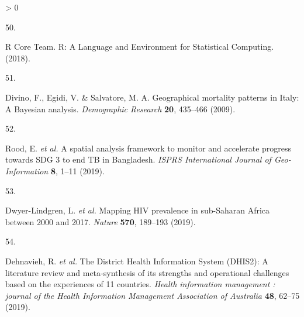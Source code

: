 \documentclass[
]{article}
\newlength{\cslhangindent}
\newlength{\csllabelwidth}
\newenvironment{CSLReferences}[2] %
 {%
  \setlength{\parindent}{0pt}
  \ifodd #1 \everypar{\setlength{\hangindent}{\cslhangindent}}\ignorespaces\fi
  \ifnum #2 > 0
  \setlength{\parskip}{#2\baselineskip}
  \fi
 }%
 {}
\newcommand{\CSLLeftMargin}[1]{\parbox[t]{\csllabelwidth}{#1}}
\newcommand{\CSLRightInline}[1]{\parbox[t]{\linewidth - \csllabelwidth}{#1}\break}
\begin{document}
\begin{CSLReferences}{0}{0}
\leavevmode\hypertarget{ref-RCoreTeam2018}{}%
\CSLLeftMargin{50. }
\CSLRightInline{R Core Team. {R: A Language and Environment for Statistical Computing}. (2018).}

\leavevmode\hypertarget{ref-Divino2009}{}%
\CSLLeftMargin{51. }
\CSLRightInline{Divino, F., Egidi, V. \& Salvatore, M. A. {Geographical mortality patterns in Italy: A Bayesian analysis}. \emph{Demographic Research} \textbf{20}, 435--466 (2009).}

\leavevmode\hypertarget{ref-Rood2019}{}%
\CSLLeftMargin{52. }
\CSLRightInline{Rood, E. \emph{et al.} {A spatial analysis framework to monitor and accelerate progress towards SDG 3 to end TB in Bangladesh}. \emph{ISPRS International Journal of Geo-Information} \textbf{8}, 1--11 (2019).}

\leavevmode\hypertarget{ref-Dwyer-Lindgren2019}{}%
\CSLLeftMargin{53. }
\CSLRightInline{Dwyer-Lindgren, L. \emph{et al.} {Mapping HIV prevalence in sub-Saharan Africa between 2000 and 2017}. \emph{Nature} \textbf{570}, 189--193 (2019).}

\leavevmode\hypertarget{ref-Dehnavieh2019}{}%
\CSLLeftMargin{54. }
\CSLRightInline{Dehnavieh, R. \emph{et al.} {The District Health Information System (DHIS2): A literature review and meta-synthesis of its strengths and operational challenges based on the experiences of 11 countries}. \emph{Health information management : journal of the Health Information Management Association of Australia} \textbf{48}, 62--75 (2019).}

\end{CSLReferences}
\end{document}
